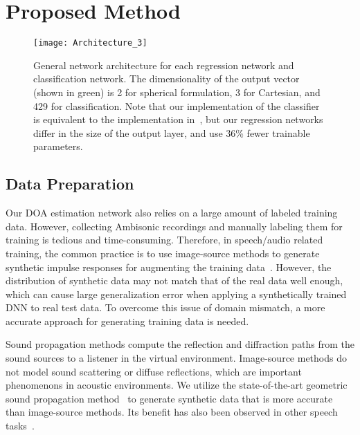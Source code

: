 \documentclass[a4paper]{article}
\begin{document}
 \section{Proposed Method}
\begin{figure}[t]\centering \texttt{[image: Architecture\_3]}\vspace{-1em}
 \caption{General network architecture for each regression network and classification network. The dimensionality of the output vector (shown in green) is 2 for spherical formulation, 3 for Cartesian, and 429 for classification. Note that our implementation of the classifier is equivalent to the implementation in~\cite{perotin2018crnn}, but our regression networks differ in the size of the output layer, and use 36\% fewer trainable parameters.}
 \vspace{-2em}
\label{fig:architecture}
\end{figure}

\subsection{Data Preparation}
Our DOA estimation network also relies on a large amount of labeled training data. However, collecting Ambisonic recordings and manually labeling them for training is tedious and time-consuming. Therefore, in speech/audio related training, the common practice is to use image-source methods to generate synthetic impulse responses for augmenting the training data~\cite{ko2017study}. However, the distribution of synthetic data may not match that of the real data well enough, which can cause large generalization error when applying a synthetically trained DNN to real test data. To overcome this issue of domain mismatch, a more accurate approach for generating training data is needed.

Sound propagation methods compute the reflection and diffraction paths from the sound sources to a listener in the virtual environment. Image-source methods do not model sound scattering or diffuse reflections, which are important phenomenons in acoustic environments. We utilize the state-of-the-art geometric sound propagation method~\cite{schissler2011gsound,schissler2014high,schissler2017interactive} to generate synthetic data that is more accurate than image-source methods. Its benefit has also been observed in other speech tasks~\cite{tang2019improving}.
\end{document}
